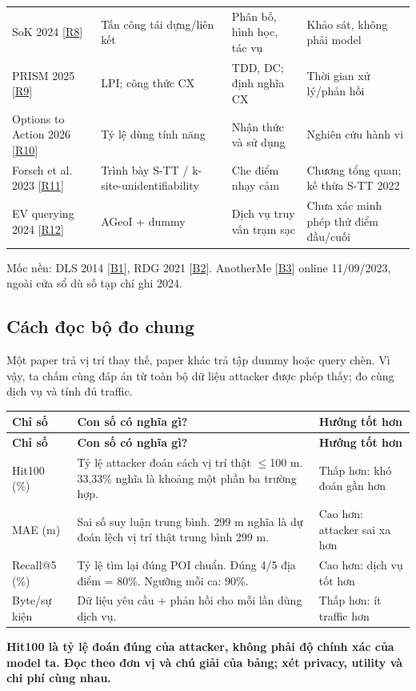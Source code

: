 \documentclass[10pt,a4paper]{article}
\newcommand{\key}[1]{\par\smallskip\noindent\colorbox{pale}{\parbox{\dimexpr\linewidth-2\fboxsep}{\textbf{#1}}}\par\smallskip}
\begin{document}
\begin{longtable}{@{}P{3.871cm}P{4.355cm}P{3.871cm}P{4.258cm}@{}}
\addlinespace[3pt]
SoK 2024 [\hyperlink{ref-R8}{R8}] & Tấn công tái dựng/liên kết & Phân bố, hình học, tác vụ & Khảo sát, không phải model\\
\addlinespace[3pt]
PRISM 2025 [\hyperlink{ref-R9}{R9}] & LPI; công thức CX & TDD, DC; định nghĩa CX & Thời gian xử lý/phản hồi\\
\addlinespace[3pt]
Options to Action 2026 [\hyperlink{ref-R10}{R10}] & Tỷ lệ dùng tính năng & Nhận thức và sử dụng & Nghiên cứu hành vi\\
\addlinespace[3pt]
Forsch et al. 2023 [\hyperlink{ref-R11}{R11}] & Trình bày S-TT / k-site-unidentifiability & Che điểm nhạy cảm & Chương tổng quan; kế thừa S-TT 2022\\
\addlinespace[3pt]
EV querying 2024 [\hyperlink{ref-R12}{R12}] & AGeoI + dummy & Dịch vụ truy vấn trạm sạc & Chưa xác minh phép thử điểm đầu/cuối\\
\end{longtable}
\endgroup
Mốc nền: DLS 2014 [\hyperlink{ref-B1}{B1}], RDG 2021 [\hyperlink{ref-B2}{B2}]. AnotherMe [\hyperlink{ref-B3}{B3}] online 11/09/2023, ngoài cửa sổ dù số tạp chí ghi 2024.

\subsection{Cách đọc bộ đo chung}\label{sub:1.2}
Một paper trả vị trí thay thế, paper khác trả tập dummy hoặc query chèn. Vì vậy, ta chấm cùng đáp án từ toàn bộ dữ liệu attacker được phép thấy; đo cùng dịch vụ và tính đủ traffic.

\begingroup\small
\begin{longtable}{@{}P{3.150cm}P{8.959cm}P{4.529cm}@{}}
\toprule
\textbf{Chỉ số} & \textbf{Con số có nghĩa gì?} & \textbf{Hướng tốt hơn}\\\midrule
\endfirsthead
\toprule
\textbf{Chỉ số} & \textbf{Con số có nghĩa gì?} & \textbf{Hướng tốt hơn}\\\midrule
\endhead
\bottomrule\endfoot
Hit100 (\%) & Tỷ lệ attacker đoán cách vị trí thật $\le$100 m. 33,33\% nghĩa là khoảng một phần ba trường hợp. & Thấp hơn: khó đoán gần hơn\\
\addlinespace[3pt]
MAE (m) & Sai số suy luận trung bình. 299 m nghĩa là dự đoán lệch vị trí thật trung bình 299 m. & Cao hơn: attacker sai xa hơn\\
\addlinespace[3pt]
Recall@5 (\%) & Tỷ lệ tìm lại đúng POI chuẩn. Đúng 4/5 địa điểm = 80\%. Ngưỡng mỗi ca: 90\%. & Cao hơn: dịch vụ tốt hơn\\
\addlinespace[3pt]
Byte/sự kiện & Dữ liệu yêu cầu + phản hồi cho mỗi lần dùng dịch vụ. & Thấp hơn: ít traffic hơn\\
\end{longtable}
\endgroup
\key{Hit100 là tỷ lệ đoán đúng của attacker, không phải độ chính xác của model ta. Đọc theo đơn vị và chú giải của bảng; xét privacy, utility và chi phí cùng nhau.}
\end{document}
